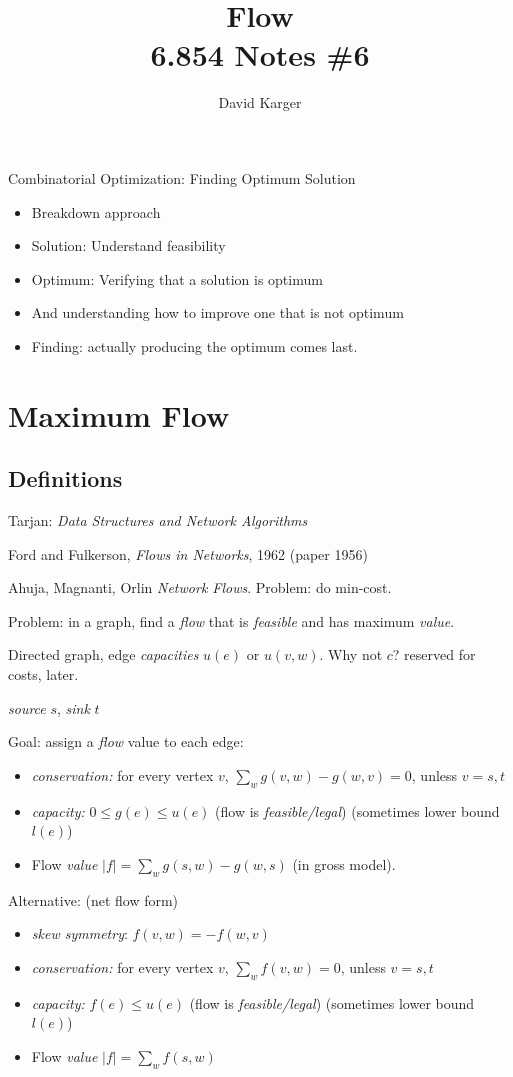 \documentclass{article}
\title{Flow\\ 6.854 Notes \#6}
\author{David Karger}
\begin{document}

Combinatorial Optimization: Finding Optimum Solution
\begin{itemize}
\item Breakdown approach
\item Solution: Understand feasibility
\item Optimum: Verifying that a solution is optimum
\item And understanding how to improve one that is not optimum
\item Finding: actually producing the optimum comes last.
\end{itemize}

\section{Maximum Flow}

\subsection{Definitions}

Tarjan: \emph{Data Structures and Network Algorithms}

Ford and Fulkerson, \emph{Flows in Networks}, 1962 (paper 1956)

Ahuja, Magnanti, Orlin \emph{Network Flows}.  Problem: do min-cost.

Problem: in a graph, find a \emph{flow} that is \emph{feasible} and has
maximum \emph{value}.

Directed graph, edge \emph{capacities} $u(e)$ or $u(v,w)$.  Why not
$c$? reserved for costs, later.

\emph{source} $s$, \emph{sink} $t$

Goal: assign a \emph{flow} value to each edge:
\begin{itemize}
\item \emph{conservation:} for every vertex $v$, $\sum_w g(v,w)-g(w,v)=0$, unless $v=s,t$
\item \emph{capacity:} $0 \le g(e) \le u(e)$ (flow is {\em
    feasible/legal}) (sometimes lower bound $l(e)$)
\item Flow \emph{value} $|f| = \sum_w g(s,w)-g(w,s)$ (in gross model).
\end{itemize}

Alternative: (net flow form)
\begin{itemize}
\item \emph{skew symmetry}: $f(v,w) = -f(w,v)$
\item \emph{conservation:} for every vertex $v$, $\sum_w f(v,w)=0$, unless $v=s,t$
\item \emph{capacity:} $f(e) \le u(e)$ (flow is {\em
    feasible/legal}) (sometimes lower bound $l(e)$)
\item Flow \emph{value} $|f| = \sum_w f(s,w)$
\end{itemize}
\end{document}
